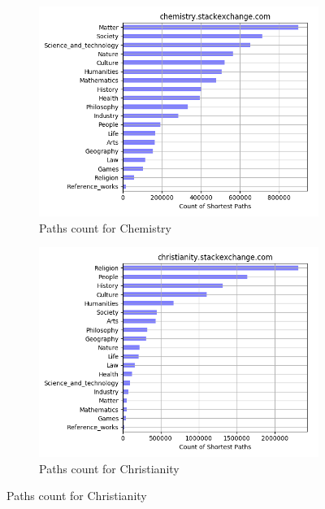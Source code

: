 \begin{figure}[H]
     \begin{subfigure}{0.5\textwidth}
    \centering
        \includegraphics[width=1\linewidth]{imgs/path-counts/chemistry_stackexchange_com}
        \caption{Paths count for Chemistry}
        \label{fig:path-count-chemistry}
    \end{subfigure}%
    \begin{subfigure}{0.5\textwidth}
    \centering
        \includegraphics[width=1\linewidth]{imgs/path-counts/christianity_stackexchange_com}
        \caption{Paths count for Christianity}
        \label{fig:path-count-christianity}
    \end{subfigure}


\end{figure}
